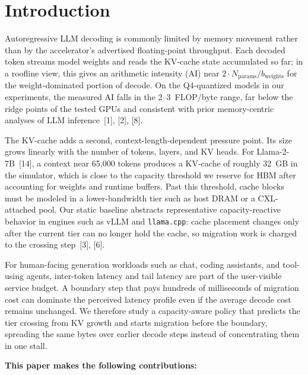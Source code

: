\documentclass[conference]{IEEEtran}
\begin{document}
\section{Introduction}

Autoregressive LLM decoding is commonly limited by memory movement rather than by the accelerator's advertised floating-point throughput. Each decoded token streams model weights and reads the KV-cache state accumulated so far; in a roofline view, this gives an arithmetic intensity (AI) near $2 \cdot N_{\text{params}} / b_{\text{weights}}$ for the weight-dominated portion of decode. On the Q4-quantized models in our experiments, the measured AI falls in the 2--3~FLOP/byte range, far below the ridge points of the tested GPUs and consistent with prior memory-centric analyses of LLM inference~[1], [2], [8].

The KV-cache adds a second, context-length-dependent pressure point. Its size grows linearly with the number of tokens, layers, and KV heads. For Llama-2-7B~[14], a context near 65{,}000 tokens produces a KV-cache of roughly 32~GB in the simulator, which is close to the capacity threshold we reserve for HBM after accounting for weights and runtime buffers. Past this threshold, cache blocks must be modeled in a lower-bandwidth tier such as host DRAM or a CXL-attached pool. Our static baseline abstracts representative capacity-reactive behavior in engines such as vLLM and \texttt{llama.cpp}: cache placement changes only after the current tier can no longer hold the cache, so migration work is charged to the crossing step~[3], [6].

For human-facing generation workloads such as chat, coding assistants, and tool-using agents, inter-token latency and tail latency are part of the user-visible service budget. A boundary step that pays hundreds of milliseconds of migration cost can dominate the perceived latency profile even if the average decode cost remains unchanged. We therefore study a capacity-aware policy that predicts the tier crossing from KV growth and starts migration before the boundary, spreading the same bytes over earlier decode steps instead of concentrating them in one stall.

\textbf{This paper makes the following contributions:}
\end{document}
